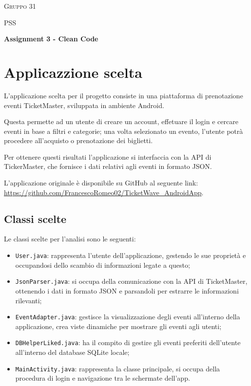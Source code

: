 \documentclass{article}
\begin{document}
\begin{titlepage}
    \centering
    {\scshape\LARGE Gruppo 31\par}
    \vspace{1cm}
    {\scshape\Large PSS\par}
    \vspace{1.5cm}
    {\huge\bfseries Assignment 3 - Clean Code\par}
    \vspace{2cm}   
\end{titlepage}


\tableofcontents
\newpage

\section{Applicazzione scelta}
L'applicazione scelta per il progetto consiste in una piattaforma di prenotazione eventi TicketMaster, sviluppata in ambiente Android.

Questa permette ad un utente di creare un account, effetuare il login e cercare eventi in base a filtri e categorie; una volta selezionato un evento, l'utente potrà procedere
all'acquisto o prenotazione dei biglietti.

Per ottenere questi risultati l'applicazione si interfaccia con la API di TickerMaster, che fornisce i dati relativi agli eventi in formato JSON.

L'applicazione originale è disponibile su GitHub al seguente link: \url{https://github.com/FrancescoRomeo02/TicketWave_AndroidApp}.

    \subsection{Classi scelte}
    Le classi scelte per l'analisi sono le seguenti:
    \begin{itemize}
        \item \texttt{User.java}: rappresenta l'utente dell'applicazione, gestendo le sue proprietà e occupandosi dello scambio di informazioni legate a questo;
        \item \texttt{JsonParser.java}: si occupa della comunicazione con la API di TicketMaster, ottenendo i dati in formato JSON e parsandoli per estrarre le informazioni rilevanti;
        \item \texttt{EventAdapter.java}: gestisce la visualizzazione degli eventi all'interno della applicazione, crea viste dinamiche per mostrare gli eventi agli utenti;
        \item \texttt{DBHelperLiked.java}: ha il compito di gestire gli eventi preferiti dell'utente all'interno del database SQLite locale;
        \item \texttt{MainActivity.java}: rappresenta la classe principale, si occupa della procedura di login e navigazione tra le schermate dell'app.
    \end{itemize}
\end{document}
